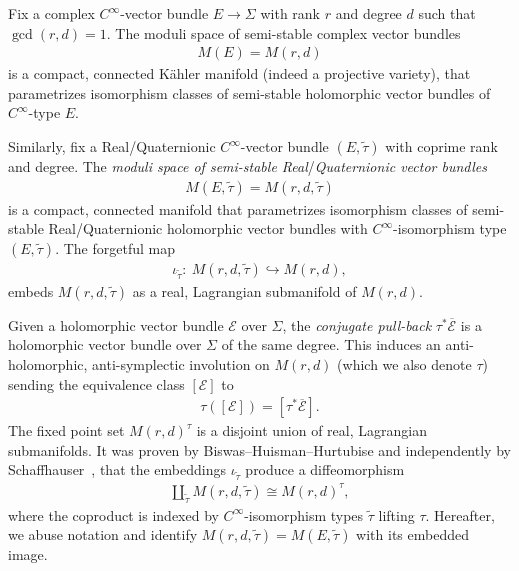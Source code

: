 \documentclass[pdftex]{sigma}
\numberwithin{equation}{section}
\begin{document}
Fix a complex $C^{\infty}$-vector bundle $E \rightarrow \Sigma$ with rank $r$ and degree $d$ such that $\operatorname{gcd}(r,d) =1$. The moduli space of semi-stable complex vector bundles
\begin{gather*} M(E) = M(r,d)\end{gather*}
is a compact, connected K\"ahler manifold (indeed a projective variety), that parametrizes isomorphism classes of semi-stable holomorphic vector bundles of $C^{\infty}$-type $E$.

{\sloppy Similarly, f\/ix a Real/Quaternionic $C^{\infty}$-vector bundle $(E,\tilde{\tau})$ with coprime rank and degree. The \emph{moduli space of semi-stable Real}/\emph{Quaternionic vector bundles} \begin{gather*}M(E,\tilde{\tau}) = M(r,d,\tilde{\tau})\end{gather*}
is a compact, connected manifold that parametrizes isomorphism classes of semi-stable Real/Qua\-ter\-nio\-nic holomorphic vector bundles with $C^{\infty}$-isomorphism type $(E,\tilde{\tau})$. The forgetful map
\begin{gather*}\iota_{\tilde{\tau}}\colon \ M(r,d,\tilde{\tau}) \hookrightarrow M(r,d),\end{gather*}
embeds $M(r,d,\tilde{\tau})$ as a real, Lagrangian submanifold of $M(r,d)$.

}

Given a holomorphic vector bundle ${\mathcal E}$ over $\Sigma$, the \emph{conjugate pull-back} $\tau^*\overline{{\mathcal E}}$ is a holomorphic vector bundle over $\Sigma$ of the same degree. This induces an anti-holomorphic, anti-symplectic involution on $M(r,d)$ (which we also denote $\tau$) sending the equivalence class $[{\mathcal E}]$ to \begin{gather*}\tau([{\mathcal E}]) = [\tau^*\overline{{\mathcal E}}].\end{gather*} The f\/ixed point set $M(r,d)^{\tau}$ is a disjoint union of real, Lagrangian submanifolds. It was proven by Biswas--Huisman--Hurtubise \cite{BHH} and independently by Schaf\/fhauser~\cite{S11, S12}, that the embeddings $\iota_{\tilde{\tau}}$ produce a dif\/feomorphism
\begin{gather*} \coprod_{\tilde{\tau}} M(r,d,\tilde{\tau}) \cong M(r,d)^{\tau},\end{gather*}
where the coproduct is indexed by $C^{\infty}$-isomorphism types $\tilde{\tau}$ lifting $\tau$. Hereafter, we abuse notation and identify $M(r,d,\tilde{\tau})= M(E,\tilde{\tau})$ with its embedded image.
\end{document}
